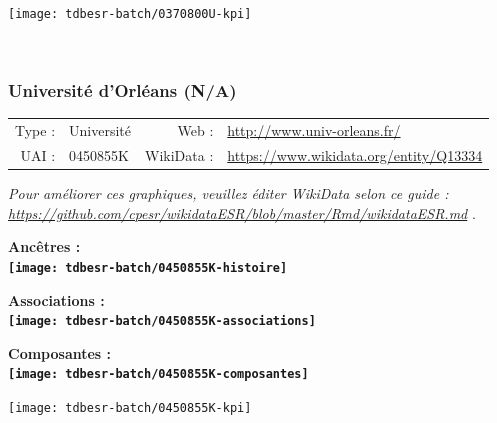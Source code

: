 \documentclass[12pt,french,]{article}
\begin{document}
\begin{center}\texttt{[image: tdbesr-batch/0370800U-kpi]} \end{center}\checkoddpage

\ifoddpage \fi ~\newpage  

\hypertarget{universituxe9-dorluxe9ans-na}{%
\subsubsection{Université d'Orléans
(N/A)}\label{universituxe9-dorluxe9ans-na}}

\begin{tabular*}{\textwidth}{rp{5cm}rl}  
\hline  
Type : & Université & Web : &\href{http://www.univ-orleans.fr/}{http://www.univ-orleans.fr/} \\  
UAI : & 0450855K & WikiData : & \href{https://www.wikidata.org/entity/Q13334}{https://www.wikidata.org/entity/Q13334} \\  
\hline  
\end{tabular*}

\textit{\scriptsize Pour améliorer ces graphiques, veuillez éditer WikiData selon ce guide :  \href{https://github.com/cpesr/wikidataESR/blob/master/Rmd/wikidataESR.md}{https://github.com/cpesr/wikidataESR/blob/master/Rmd/wikidataESR.md}}
.

\vspace{1cm}  
\begin{minipage}[b]{0.50\textwidth}\begin{center} \bf Ancêtres : \\  
\texttt{[image: tdbesr-batch/0450855K-histoire]} \end{center}\end{minipage}\begin{minipage}[b]{0.50\textwidth}\begin{center} \bf Associations : \\  
\texttt{[image: tdbesr-batch/0450855K-associations]} \end{center}\end{minipage}

\hrulefill

\begin{center} \bf Composantes : \\  
\texttt{[image: tdbesr-batch/0450855K-composantes]} \end{center}

\begin{center}\texttt{[image: tdbesr-batch/0450855K-kpi]} \end{center}\checkoddpage
\end{document}
